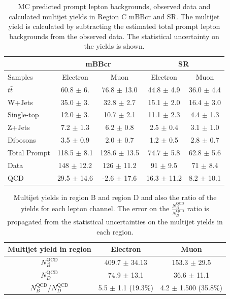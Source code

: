 \begin{table}
\begin{center}
\begin{tabular}{l|c|c||c|c}
              &\multicolumn{2}{c||}{mBBcr}               &\multicolumn{2}{c}{SR}\\
\hline
Samples       & Electron           & Muon                 & Electron          & Muon     \\      
\hline
$t\bar{t}$    &  60.8 $\pm$ 6.     & 76.8 $\pm$ 13.0      &  44.8 $\pm$ 4.9   & 36.0 $\pm$ 4.4  \\
W+Jets        &  35.0 $\pm$ 3.     &  32.8 $\pm$ 2.7      &  15.1 $\pm$ 2.0   & 16.4 $\pm$ 3.0  \\         
Single-top    &  12.0 $\pm$ 3.     &  10.7 $\pm$ 2.1      &  11.1 $\pm$ 2.3   & 4.4 $\pm$ 1.3   \\ 
Z+Jets        &  7.2 $\pm$ 1.3     &  6.2 $\pm$ 0.8       &  2.5 $\pm$ 0.4    & 3.1 $\pm$ 1.0   \\ 
Dibosons      &  3.5 $\pm$ 0.9     &  2.0 $\pm$ 0.7       &  1.2 $\pm$ 0.5    & 2.8 $\pm$ 0.7   \\
\hline 
Total Prompt  &  118.5 $\pm$ 8.1   & 128.6 $\pm$ 13.5     & 74.7 $\pm$ 5.8    & 62.8 $\pm$ 5.6  \\ 
\hline
Data          &  148 $\pm$ 12.2    & 126   $\pm$ 11.2     & 91   $\pm$ 9.5    & 71   $\pm$ 8.4  \\
\hline
QCD           & 29.5 $\pm$ 14.6    &  -2.6 $\pm$ 17.6     & 16.3 $\pm$ 11.2   & 8.2 $\pm$ 10.1  \\
\end{tabular}
\end{center}
\caption{MC predicted prompt lepton backgrounds, observed data and calculated multijet yields 
in Region C mBBcr and SR. The multijet yield is calculated by subtracting the estimated total prompt lepton
backgrounds from the observed data. The statistical uncertainty on the yields is shown.} 
\label{tab:boosted_region_c_promptbkgdscaled_data}
\end{table}

\begin{table}
\begin{center}
\begin{tabular}{c|c|c}
Multijet yield in region                & Electron              & Muon   \\      
\hline
$N_B^\text{QCD}$                        & 409.7 $\pm$ 34.13     & 153.3 $\pm$ 29.5 \\
$N_D^\text{QCD}$                        & 74.9 $\pm$ 13.1       & 36.6 $\pm$ 11.1  \\
\hline
$N_{B}^\text{QCD}$/$N_{D}^\text{QCD}$   & 5.5  $\pm$ 1.1 (19.3\%) & 4.2 $\pm$ 1.500 (35.8\%)   \\
\end{tabular}
\end{center}
\caption{Multijet yields in region B and region D and also the ratio of the yields for each lepton channel. The error
on the $\frac{N_B^\text{QCD}}{N_D^\text{QCD}}$ ratio is propagated from the statistical uncertainties on the multijet yields in each region.} 
\label{tab:boosted_bkgd_mcscaled_abcd_ratio}
\end{table}

